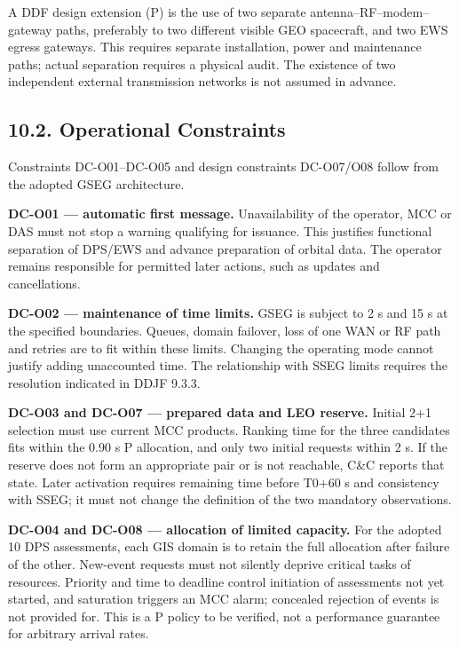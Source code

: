 A DDF design extension (P) is the use of two separate antenna–RF–modem–gateway paths, preferably to two different visible GEO spacecraft, and two EWS egress gateways. This requires separate installation, power and maintenance paths; actual separation requires a physical audit. The existence of two independent external transmission networks is not assumed in advance.

\subsection{10.2. Operational Constraints}\label{ddjf-10-2}

Constraints DC-O01–DC-O05 and design constraints DC-O07/\allowbreak{}O08 follow from the adopted GSEG architecture.

\textbf{DC-O01 — automatic first message.} Unavailability of the operator, MCC or DAS must not stop a warning qualifying for issuance. This justifies functional separation of DPS/\allowbreak{}EWS and advance preparation of orbital data. The operator remains responsible for permitted later actions, such as updates and cancellations.

\textbf{DC-O02 — maintenance of time limits.} GSEG is subject to 2 s and 15 s at the specified boundaries. Queues, domain failover, loss of one WAN or RF path and retries are to fit within these limits. Changing the operating mode cannot justify adding unaccounted time. The relationship with SSEG limits requires the resolution indicated in DDJF 9.3.3.

\textbf{DC-O03 and DC-O07 — prepared data and LEO reserve.} Initial 2+1 selection must use current MCC products. Ranking time for the three candidates fits within the 0.90 s P allocation, and only two initial requests within 2 s. If the reserve does not form an appropriate pair or is not reachable, C\&C reports that state. Later activation requires remaining time before T0+60 s and consistency with SSEG; it must not change the definition of the two mandatory observations.

\textbf{DC-O04 and DC-O08 — allocation of limited capacity.} For the adopted 10 DPS assessments, each GIS domain is to retain the full allocation after failure of the other. New-event requests must not silently deprive critical tasks of resources. Priority and time to deadline control initiation of assessments not yet started, and saturation triggers an MCC alarm; concealed rejection of events is not provided for. This is a P policy to be verified, not a performance guarantee for arbitrary arrival rates.

